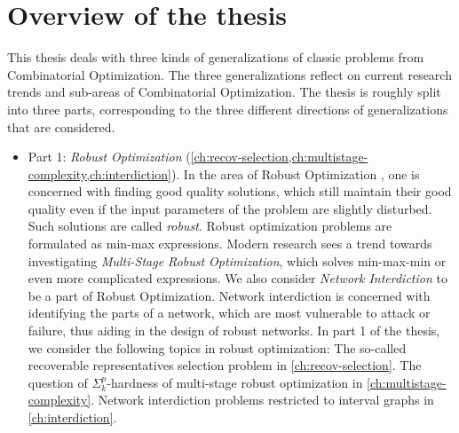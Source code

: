 \section{Overview of the thesis}

This thesis deals with three kinds of generalizations of classic problems from Combinatorial Optimization. 
The three generalizations reflect on current research trends and sub-areas of Combinatorial Optimization. 
The thesis is roughly split into three parts, corresponding to the three different directions of generalizations that are considered.

\begin{itemize}
\item Part 1: \emph{Robust Optimization} (\cref{ch:recov-selection,ch:multistage-complexity,ch:interdiction}). In the area of Robust Optimization \cite{ben2009robust}, one is concerned with finding good quality solutions, 
which still maintain their good quality even if the input parameters of the problem are slightly disturbed. Such solutions are called \emph{robust}.
Robust optimization problems are formulated as min-max expressions. Modern research sees a trend towards investigating \emph{Multi-Stage Robust Optimization}, which solves min-max-min or even more complicated expressions.
 We also consider \emph{Network Interdiction} to be a part of Robust Optimization. 
Network interdiction is concerned with identifying the parts of a network, which are most vulnerable to attack or failure, thus aiding in the design of robust networks. 
In part 1 of the thesis, we consider the following topics in robust optimization: The so-called recoverable representatives selection problem in \cref{ch:recov-selection}. The question of $\Sigma^p_k$-hardness of multi-stage robust optimization in \cref{ch:multistage-complexity}. 
Network interdiction problems restricted to interval graphs in \cref{ch:interdiction}.


\end{itemize}
